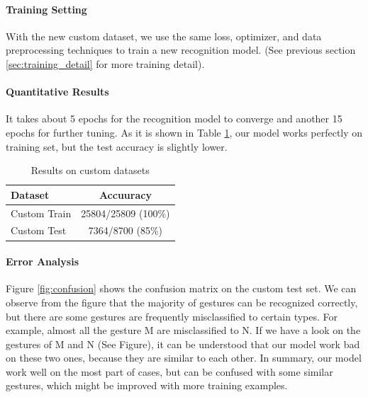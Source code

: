 \documentclass[10pt,twocolumn,letterpaper]{article}
\begin{document}
\paragraph{Training Setting}
With the new custom dataset, we use the same loss, optimizer, and data preprocessing techniques to train a new recognition model. (See previous section \ref{sec:training_detail} for more training detail).

\paragraph{Quantitative Results}
It takes about 5 epochs for the recognition model to converge and another 15 epochs for further tuning. As it is shown in Table \ref{table:result}, our model works perfectly on training set, but the test accuracy is slightly lower.

\begin{table}[h]
\begin{center}
\begin{tabular}{|l|c|}
\hline
Dataset & Accuuracy \\
\hline\hline
Custom Train & 25804/25809 (100\%) \\
Custom Test & 7364/8700 (85\%) \\
\hline
\end{tabular}
\end{center}
\caption{Results on custom datasets}
\label{table:result}
\end{table}

\paragraph{Error Analysis} Figure \ref{fig:confusion} shows the confusion matrix on the custom test set. We can observe from the figure that the majority of gestures can be recognized correctly, but there are some gestures are frequently misclassified to certain types. For example, almost all the gesture M are misclassified to N. If we have a look on the gestures of M and N (See Figure), it can be understood that our model work bad on these two ones, because they are similar to each other. In summary, our model work well on the most part of cases, but can be confused with some similar gestures, which might be improved with more training examples.
\end{document}
